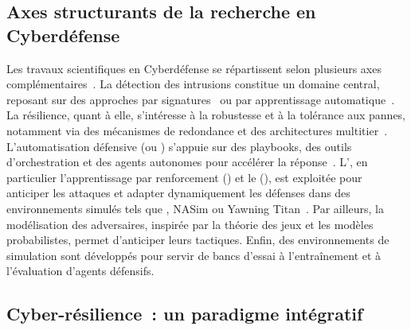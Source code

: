 

\subsection*{Axes structurants de la recherche en Cyberdéfense}

Les travaux scientifiques en Cyberdéfense se répartissent selon plusieurs axes complémentaires~\cite{Buczak2016}. La détection des intrusions constitue un domaine central, reposant sur des approches par signatures~\cite{Axelsson2000} ou par apprentissage automatique~\cite{Sommer2010,Buczak2016}. La résilience, quant à elle, s'intéresse à la robustesse et à la tolérance aux pannes, notamment via des mécanismes de redondance et des architectures multitier~\cite{Bodeau2011}. L'automatisation défensive (ou ) s'appuie sur des playbooks, des outils d'orchestration et des agents autonomes pour accélérer la réponse~\cite{Hazra2022}. L', en particulier l'apprentissage par renforcement () et le  (), est exploitée pour anticiper les attaques et adapter dynamiquement les défenses dans des environnements simulés tels que , NASim ou Yawning Titan~\cite{Standen2021, nasim2023,Andrew2022}. Par ailleurs, la modélisation des adversaires, inspirée par la théorie des jeux et les modèles probabilistes, permet d'anticiper leurs tactiques. Enfin, des environnements de simulation sont développés pour servir de bancs d'essai à l'entraînement et à l'évaluation d'agents défensifs.


\subsection*{Cyber-résilience~: un paradigme intégratif}

